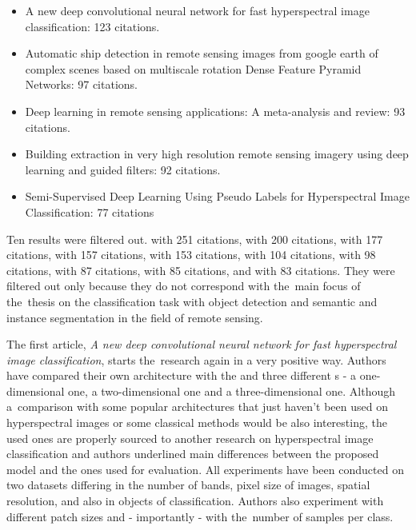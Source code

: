 \begin{itemize}
	\item A new deep convolutional neural network for fast hyperspectral image classification: 123 citations.  \cite{cnn-hs-class}
	\item Automatic ship detection in remote sensing images from google earth of complex scenes based on multiscale rotation Dense Feature Pyramid Networks: 97 citations. \cite{ship-rdfpn}
	\item Deep learning in remote sensing applications: A meta-analysis and review: 93 citations. \cite{dl-remote-sensing-review}
	\item Building extraction in very high resolution remote sensing imagery using deep learning and guided filters: 92 citations. \cite{res-u-net}
	\item Semi-Supervised Deep Learning Using Pseudo Labels for Hyperspectral Image Classification: 77 citations \cite{semi-supervised-hyperspectral}
\end{itemize}

Ten results were filtered out. \cite{dl-for-cv} with 251 citations, \cite{ir-image-fusion} with 200 citations, \cite{review-ml-in-rs} with 177 citations, \cite{rf-knn-svm-for-lc} with 157 citations, \cite{review-ml-agriculture} with 153 citations, \cite{review-uav-applications} with 104 citations, \cite{review-survey-dl} with 98 citations, \cite{dl-medicine-preprocessing} with 87 citations, \cite{state-of-the-art-ann} with 85 citations, and \cite{lc-2-0} with 83 citations. They were filtered out only because they do not correspond with the~main focus of the~thesis on the classification task with object detection and semantic and instance segmentation in the field of remote sensing.

The first article, \textit{A new deep convolutional neural network for fast hyperspectral image classification}, starts the~research again in a very positive way. Authors have compared their own architecture with the  and three different s - a one-dimensional one, a two-dimensional one and a three-dimensional one. Although a~comparison with some popular architectures that just haven't been used on hyperspectral images or some classical  methods would be also interesting, the used ones are properly sourced to another research on hyperspectral image classification and authors underlined main differences between the proposed model and the ones used for evaluation. All experiments have been conducted on two datasets differing in the number of bands, pixel size of images, spatial resolution, and also in objects of classification. Authors also experiment with different patch sizes and - importantly - with the~number of samples per class.

